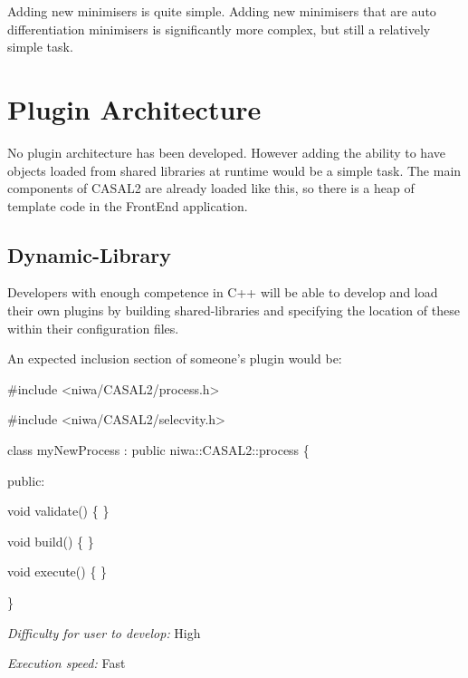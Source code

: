 \documentclass[a4paper,11pt,twoside,pdftex,draft]{article}
\begin{document}
Adding new minimisers is quite simple. Adding new minimisers that are
auto differentiation minimisers is significantly more complex, but still
a relatively simple task.

\hypertarget{section-5}{%
\section{}\label{section-5}}

\hypertarget{plugin-architecture}{%
\section[Plugin
Architecture]{\texorpdfstring{\protect\hypertarget{anchor-32}{}{}Plugin
Architecture}{Plugin Architecture}}\label{plugin-architecture}}

No plugin architecture has been developed. However adding the ability to
have objects loaded from shared libraries at runtime would be a simple
task. The main components of CASAL2 are already loaded like this, so
there is a heap of template code in the FrontEnd application.

\hypertarget{dynamic-library}{%
\subsection[Dynamic-Library]{\texorpdfstring{\protect\hypertarget{anchor-33}{}{}Dynamic-Library}{Dynamic-Library}}\label{dynamic-library}}

Developers with enough competence in C++ will be able to develop and
load their own plugins by building shared-libraries and specifying the
location of these within their configuration files.

An expected inclusion section of someone's plugin would be:

\#include \textless niwa/CASAL2/process.h\textgreater{}

\#include \textless niwa/CASAL2/selecvity.h\textgreater{}

class myNewProcess : public niwa::CASAL2::process \{

public:

void validate() \{ \}

void build() \{ \}

void execute() \{ \}

\}

\emph{Difficulty for user to develop:} High

\emph{Execution speed:} Fast
\end{document}
